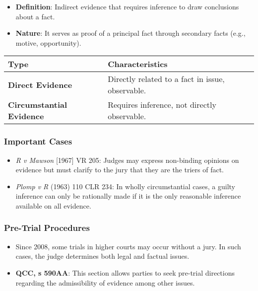 \begin{itemize}
\tightlist
\item
  \textbf{Definition}: Indirect evidence that requires inference to draw
  conclusions about a fact.
\item
  \textbf{Nature}: It serves as proof of a principal fact through
  secondary facts (e.g., motive, opportunity).
\end{itemize}

\begin{longtable}[]{@{}
  >{\raggedright\arraybackslash}p{}
  >{\raggedright\arraybackslash}p{}@{}}
\toprule\noalign{}
\begin{minipage}[b]{\linewidth}\raggedright
Type
\end{minipage} & \begin{minipage}[b]{\linewidth}\raggedright
Characteristics
\end{minipage} \\
\midrule\noalign{}
\endhead
\bottomrule\noalign{}
\endlastfoot
\textbf{Direct Evidence} & Directly related to a fact in issue,
observable. \\
\textbf{Circumstantial Evidence} & Requires inference, not directly
observable. \\
\end{longtable}

\subsubsection{Important Cases}\label{important-cases}

\begin{itemize}
\tightlist
\item
  \emph{R v Mawson} {[}1967{]} VR 205: Judges may express non-binding
  opinions on evidence but must clarify to the jury that they are the
  triers of fact.
\item
  \emph{Plomp v R} (1963) 110 CLR 234: In wholly circumstantial cases, a
  guilty inference can only be rationally made if it is the only
  reasonable inference available on all evidence.
\end{itemize}

\subsubsection{Pre-Trial Procedures}\label{pre-trial-procedures}

\begin{itemize}
\item
  Since 2008, some trials in higher courts may occur without a jury. In
  such cases, the judge determines both legal and factual issues.
\item
  \textbf{QCC, s 590AA}: This section allows parties to seek pre-trial
  directions regarding the admissibility of evidence among other issues.
\end{itemize}

